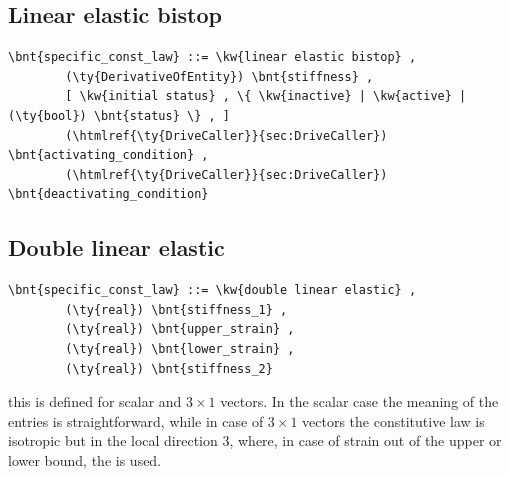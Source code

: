 \subsection{Linear elastic bistop}
\begin{Verbatim}[commandchars=\\\{\}]
    \bnt{specific_const_law} ::= \kw{linear elastic bistop} ,
        (\ty{DerivativeOfEntity}) \bnt{stiffness} ,
        [ \kw{initial status} , \{ \kw{inactive} | \kw{active} | (\ty{bool}) \bnt{status} \} , ]
        (\htmlref{\ty{DriveCaller}}{sec:DriveCaller}) \bnt{activating_condition} ,
        (\htmlref{\ty{DriveCaller}}{sec:DriveCaller}) \bnt{deactivating_condition}
\end{Verbatim}
  
\subsection{Double linear elastic}
\begin{Verbatim}[commandchars=\\\{\}]
    \bnt{specific_const_law} ::= \kw{double linear elastic} ,
        (\ty{real}) \bnt{stiffness_1} ,
        (\ty{real}) \bnt{upper_strain} ,
        (\ty{real}) \bnt{lower_strain} ,
        (\ty{real}) \bnt{stiffness_2}
\end{Verbatim}
this is defined for scalar and $3 \times 1$ vectors. In the scalar case the
meaning of the entries is straightforward,
while in case of $3 \times 1$ vectors the constitutive law is isotropic
but in the local direction 3, where, in case of strain
out of the upper or lower bound, the  is used.

